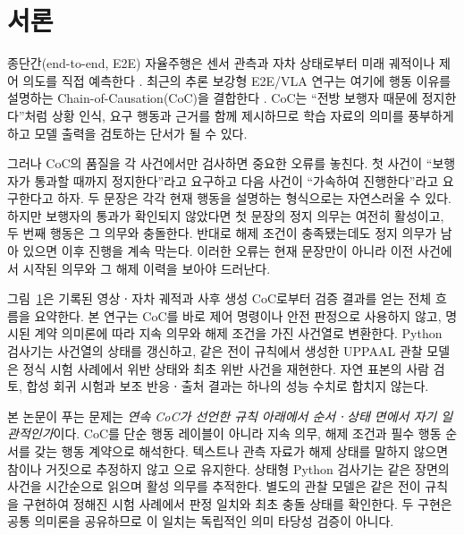 \section{서론}
\label{sec:intro}

종단간(end-to-end, E2E) 자율주행은 센서 관측과 자차 상태로부터 미래 궤적이나 제어 의도를 직접 예측한다 \cite{hu2023uniad,jiang2023vad}. 최근의 추론 보강형 E2E/VLA 연구는 여기에 행동 이유를 설명하는 Chain-of-Causation(CoC)을 결합한다 \cite{sima2024drivelm,tian2024drivevlm,wang2025alpamayo}. CoC는 ``전방 보행자 때문에 정지한다''처럼 상황 인식, 요구 행동과 근거를 함께 제시하므로 학습 자료의 의미를 풍부하게 하고 모델 출력을 검토하는 단서가 될 수 있다.

그러나 CoC의 품질을 각 사건에서만 검사하면 중요한 오류를 놓친다. 첫 사건이 ``보행자가 통과할 때까지 정지한다''라고 요구하고 다음 사건이 ``가속하여 진행한다''라고 요구한다고 하자. 두 문장은 각각 현재 행동을 설명하는 형식으로는 자연스러울 수 있다. 하지만 보행자의 통과가 확인되지 않았다면 첫 문장의 정지 의무는 여전히 활성이고, 두 번째 행동은 그 의무와 충돌한다. 반대로 해제 조건이 충족됐는데도 정지 의무가 남아 있으면 이후 진행을 계속 막는다. 이러한 오류는 현재 문장만이 아니라 이전 사건에서 시작된 의무와 그 해제 이력을 보아야 드러난다.

\begin{figure}[t]
\centering

\label{fig:overview-pipeline}
\end{figure}

그림~\ref{fig:overview-pipeline}은 기록된 영상ㆍ자차 궤적과 사후 생성 CoC로부터 검증 결과를 얻는 전체 흐름을 요약한다. 본 연구는 CoC를 바로 제어 명령이나 안전 판정으로 사용하지 않고, 명시된 계약 의미론에 따라 지속 의무와 해제 조건을 가진 사건열로 변환한다. Python 검사기는 사건열의 상태를 갱신하고, 같은 전이 규칙에서 생성한 UPPAAL 관찰 모델은 정식 시험 사례에서 위반 상태와 최초 위반 사건을 재현한다. 자연 표본의 사람 검토, 합성 회귀 시험과 보조 반응ㆍ출처 결과는 하나의 성능 수치로 합치지 않는다.

본 논문이 푸는 문제는 \emph{연속 CoC가 선언한 규칙 아래에서 순서ㆍ상태 면에서 자기 일관적인가}이다. CoC를 단순 행동 레이블이 아니라 지속 의무, 해제 조건과 필수 행동 순서를 갖는 행동 계약으로 해석한다. 텍스트나 관측 자료가 해제 상태를 말하지 않으면 참이나 거짓으로 추정하지 않고 {\unknown}으로 유지한다. 상태형 Python 검사기는 같은 장면의 사건을 시간순으로 읽으며 활성 의무를 추적한다. 별도의 \uppaal 관찰 모델은 같은 전이 규칙을 구현하여 정해진 시험 사례에서 판정 일치와 최초 충돌 상태를 확인한다. 두 구현은 공통 의미론을 공유하므로 이 일치는 독립적인 의미 타당성 검증이 아니다.

